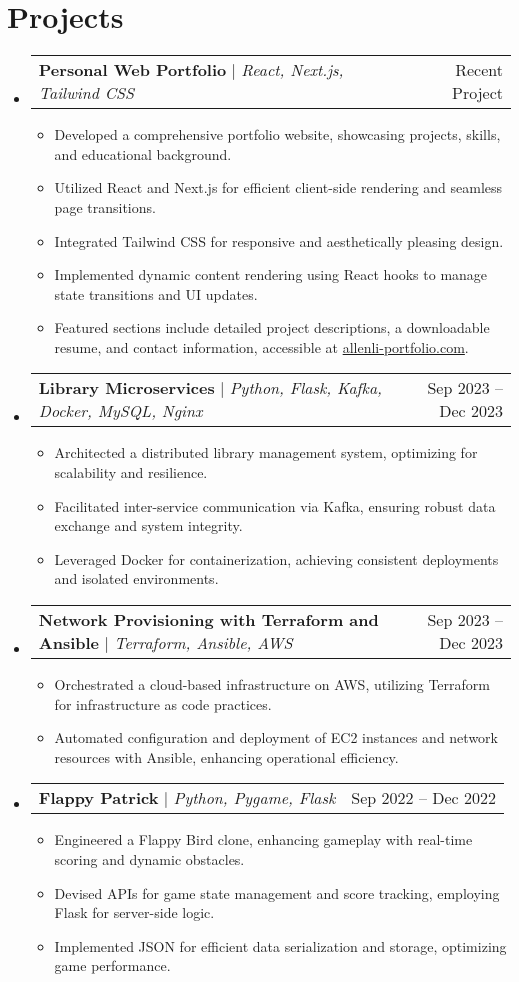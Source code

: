 \documentclass[letterpaper,11pt]{article}
\makeatletter
\newcommand{\resumeItem}[1]{
  \item\small{
    {#1 \vspace{-2pt}}
  }
}
\newcommand{\resumeProjectHeading}[2]{
    \item
    \begin{tabular*}{0.97\textwidth}{l@{\extracolsep{\fill}}r}
      \small#1 & #2 \\
    \end{tabular*}\vspace{-7pt}
}
\newcommand{\resumeSubHeadingListStart}{\begin{itemize}[leftmargin=0.15in, label={}]}
\newcommand{\resumeSubHeadingListEnd}{\end{itemize}}
\newcommand{\resumeItemListStart}{\begin{itemize}}
\newcommand{\resumeItemListEnd}{\end{itemize}\vspace{-5pt}}
\makeatother
\begin{document}
\section{Projects}
  \resumeSubHeadingListStart

  \resumeProjectHeading
  {\textbf{Personal Web Portfolio} $|$ \emph{React, Next.js, Tailwind CSS}}{Recent Project}
  \resumeItemListStart
    \resumeItem{Developed a comprehensive portfolio website, showcasing projects, skills, and educational background.}
    \resumeItem{Utilized React and Next.js for efficient client-side rendering and seamless page transitions.}
    \resumeItem{Integrated Tailwind CSS for responsive and aesthetically pleasing design.}
    \resumeItem{Implemented dynamic content rendering using React hooks to manage state transitions and UI updates.}
    \resumeItem{Featured sections include detailed project descriptions, a downloadable resume, and contact information, accessible at \href{https://www.allenli-portfolio.com}{allenli-portfolio.com}.}
  \resumeItemListEnd
    \resumeProjectHeading
      {\textbf{Library Microservices} $|$ \emph{Python, Flask, Kafka, Docker, MySQL, Nginx}}{Sep 2023 -- Dec 2023}
      \resumeItemListStart
        \resumeItem{Architected a distributed library management system, optimizing for scalability and resilience.}
        \resumeItem{Facilitated inter-service communication via Kafka, ensuring robust data exchange and system integrity.}
        \resumeItem{Leveraged Docker for containerization, achieving consistent deployments and isolated environments.}
      \resumeItemListEnd

    \resumeProjectHeading
      {\textbf{Network Provisioning with Terraform and Ansible} $|$ \emph{Terraform, Ansible, AWS}}{Sep 2023 -- Dec 2023}
      \resumeItemListStart
        \resumeItem{Orchestrated a cloud-based infrastructure on AWS, utilizing Terraform for infrastructure as code practices.}
        \resumeItem{Automated configuration and deployment of EC2 instances and network resources with Ansible, enhancing operational efficiency.}
      \resumeItemListEnd

  

    \resumeProjectHeading
      {\textbf{Flappy Patrick} $|$ \emph{Python, Pygame, Flask}}{Sep 2022 -- Dec 2022}
      \resumeItemListStart
        \resumeItem{Engineered a Flappy Bird clone, enhancing gameplay with real-time scoring and dynamic obstacles.}
        \resumeItem{Devised APIs for game state management and score tracking, employing Flask for server-side logic.}
        \resumeItem{Implemented JSON for efficient data serialization and storage, optimizing game performance.}
      \resumeItemListEnd
  \resumeSubHeadingListEnd
\end{document}
